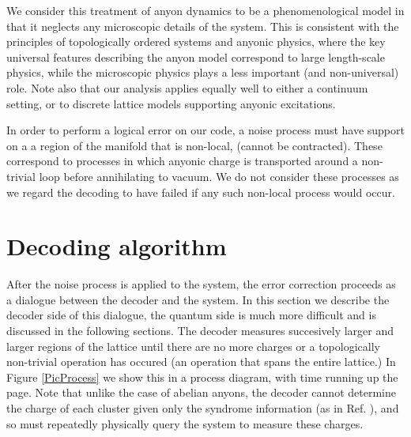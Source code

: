 We consider this treatment of anyon dynamics to be a phenomenological model in that
it neglects any microscopic details of the system.
This is consistent with the principles of topologically
ordered systems and anyonic physics, where the key universal features describing the
anyon model correspond to large length-scale physics, while the microscopic physics plays
a less important (and non-universal) role. Note also that our analysis applies equally well to either a continuum setting, or to discrete lattice models supporting anyonic excitations.

In order to perform a logical error on our code, a noise process must have support on a
a region of the manifold that is non-local, (cannot be contracted).
These correspond to processes in which anyonic charge is transported around a non-trivial loop before annihilating to vacuum.
We do not consider these processes as we regard the decoding
to have failed if any such non-local process would occur.



%
%

\section{Decoding algorithm}

After the noise process is applied to the system,
the error correction proceeds as a dialogue between the
decoder and the system. 
In this section we describe the decoder side of this dialogue,
the quantum side is much more difficult and is discussed in the
following sections.
%
%
%
The decoder measures succesively larger and larger
regions of the lattice
until there are no more charges 
or a topologically non-trivial operation has occured
(an operation that spans the entire lattice.)
In Figure \ref{PicProcess}
we show this in a process diagram, with time running up
the page.
Note that unlike the case of abelian anyons, the decoder
cannot determine the charge of each cluster 
given only the syndrome information (as in Ref. \cite{Bravyi2011}),
and so must repeatedly physically query the system to measure these charges.




